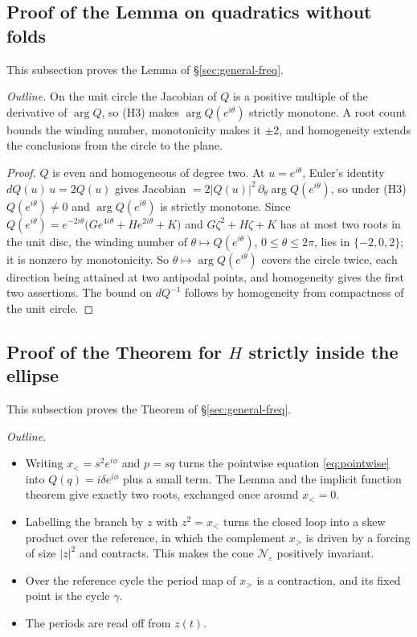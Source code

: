 \documentclass[11pt,reqno]{amsart}
\theoremstyle{plain}
\theoremstyle{definition}
\theoremstyle{remark}
\begin{document}
\subsection{Proof of the Lemma on quadratics without folds}\label{app:double}
This subsection proves the Lemma of \S\ref{sec:general-freq}.

\emph{Outline.} On the unit circle the Jacobian of $Q$ is a positive multiple of the derivative of $\arg Q$,
so (H3) makes $\arg Q(e^{i\theta})$ strictly monotone. A root count bounds the winding number, monotonicity makes
it $\pm2$, and homogeneity extends the conclusions from the circle to the plane.

\begin{proof}
$Q$ is even and homogeneous of degree two. At $u=e^{i\theta}$, Euler's identity
$dQ(u)\,u=2Q(u)$ gives Jacobian $=2|Q(u)|^{2}\,\partial_\theta\arg Q(e^{i\theta})$, so under (H3)
$Q(e^{i\theta})\neq0$ and $\arg Q(e^{i\theta})$ is strictly monotone. Since
$Q(e^{i\theta})=e^{-2i\theta}\bigl(Ge^{4i\theta}+He^{2i\theta}+K\bigr)$ and $G\zeta^{2}+H\zeta+K$ has
at most two roots in the unit disc, the winding number of $\theta\mapsto Q(e^{i\theta})$,
$0\le\theta\le2\pi$, lies in $\{-2,0,2\}$; it is nonzero by monotonicity. So
$\theta\mapsto\arg Q(e^{i\theta})$ covers the circle twice, each direction being attained at two
antipodal points, and homogeneity gives the first two assertions. The bound on $dQ^{-1}$ follows by
homogeneity from compactness of the unit circle.
\end{proof}

\subsection{Proof of the Theorem for $H$ strictly inside the ellipse}\label{app:main}
This subsection proves the Theorem of \S\ref{sec:general-freq}.

\emph{Outline.}
\begin{itemize}
\item[(i)] Writing $x_<=s^{2}e^{i\phi}$ and $p=sq$ turns the pointwise equation \eqref{eq:pointwise}
into $Q(q)=i\delta e^{i\phi}$ plus a small term. The Lemma and the implicit function theorem give exactly two
roots, exchanged once around $x_<=0$.
\item[(ii)] Labelling the branch by $z$ with $z^{2}=x_<$ turns the closed loop into
a skew product over the reference, in which the complement $x_>$ is driven by a forcing of size $|z|^{2}$ and
contracts. This makes the cone $\mathcal N_\varepsilon$ positively invariant.
\item[(iii)] Over the reference cycle the period
map of $x_>$ is a contraction, and its fixed point is the cycle $\gamma$.
\item[(iv)] The periods are read off from
$z(t)$.
\end{itemize}
\end{document}
